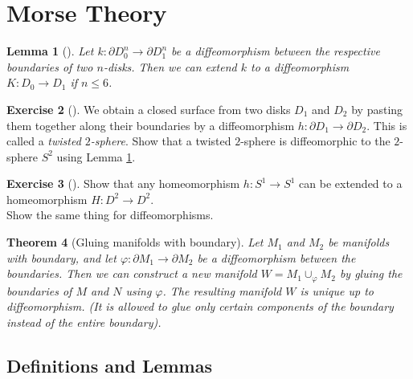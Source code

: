 \documentclass[reqno]{amsart}
\newtheorem{theorem}{Theorem}[section]
\newtheorem{lemma}[theorem]{Lemma}
\theoremstyle{definition}
\newtheorem{exercise}[theorem]{Exercise}
\theoremstyle{remark}
\begin{document}
        
        


    \section{Morse Theory}

    \begin{lemma}[]\label{Lemma:10231924}
        Let $k \colon \partial D_0^{n} \to 
        \partial D_1^{n}$ be
        a diffeomorphism between the respective boundaries
        of two $n$-disks. Then we can extend $k$ to a 
        diffeomorphism $K \colon D_0 \to D_1$ if
         $n \le 6$.
    \end{lemma}

    \begin{exercise}[]
        We obtain a closed surface from two disks
        $D_1$ and $D_2$ by pasting them together along their
        boundaries by a diffeomorphism $h \colon
        \partial D_1 \to \partial D_2$. This is
        called a \textit{twisted $2$-sphere}. Show that
        a twisted $2$-sphere is diffeomorphic to
        the $2$-sphere $S^2$ using Lemma \ref{Lemma:10231924}.
    \end{exercise}

    \begin{exercise}[]
        Show that any homeomorphism
        $h \colon S^{1} \to S^{1}$ can be extended
        to a homeomorphism $H \colon D^2 \to D^2$.\\
        Show the same thing for diffeomorphisms.
    \end{exercise}

    \begin{theorem}[Gluing manifolds with boundary]
        Let $M_1$ and $M_2$ be manifolds with boundary,
        and let $\varphi \colon \partial M_1 \to 
        \partial M_2$ be a diffeomorphism between
        the boundaries. Then we can construct a new
        manifold $W = M_1 \cup_{\varphi } M_2$ by
        gluing the boundaries of $M$ and $N$ using $\varphi $.
        The resulting manifold $W$ is unique up to diffeomorphism.
        (It is allowed to glue only certain
        components of the boundary instead of the
        entire boundary).
    \end{theorem}

    \subsection{Definitions and Lemmas}
\end{document}
